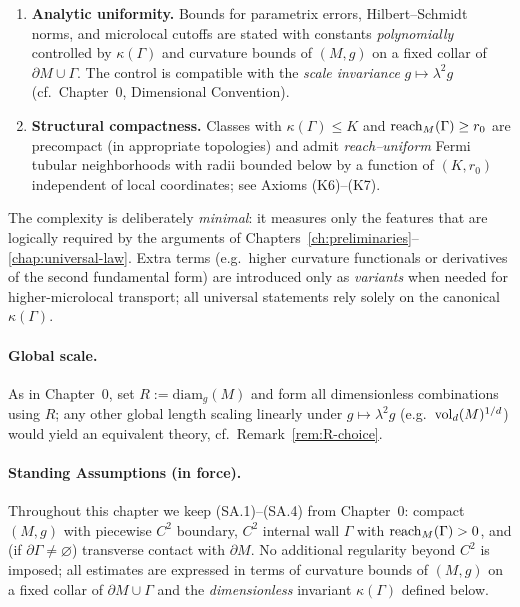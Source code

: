 \begin{enumerate}
  \item \textbf{Analytic uniformity.} Bounds for parametrix errors, Hilbert--Schmidt norms, and microlocal cutoffs are stated with constants \emph{polynomially} controlled by $\kappa(\Gamma)$ and curvature bounds of $(M,g)$ on a fixed collar of $\partial M\cup\Gamma$. The control is compatible with the \emph{scale invariance} $g\mapsto \lambda^2 g$ (cf.\ Chapter~0, Dimensional Convention).
  \item \textbf{Structural compactness.} Classes with $\kappa(\Gamma)\le K$ and $\operatorname{reach}_M(\Gamma)\ge r_0$ are precompact (in appropriate topologies) and admit \emph{reach--uniform} Fermi tubular neighborhoods with radii bounded below by a function of $(K,r_0)$ independent of local coordinates; see Axioms (K6)–(K7).
\end{enumerate}

The complexity is deliberately \emph{minimal}: it measures only the features that are logically required by the arguments of Chapters~\ref{ch:preliminaries}–\ref{chap:universal-law}. Extra terms (e.g.\ higher curvature functionals or derivatives of the second fundamental form) are introduced only as \emph{variants} when needed for higher-microlocal transport; all universal statements rely solely on the canonical $\kappa(\Gamma)$.

\paragraph{Global scale.}
As in Chapter~0, set $R:=\mathrm{diam}_g(M)$ and form all dimensionless combinations using $R$; any other global length scaling linearly under $g\mapsto \lambda^2 g$ (e.g.\ $\operatorname{vol}_d(M)^{1/d}$) would yield an equivalent theory, cf.\ Remark~\ref{rem:R-choice}.

\paragraph{Standing Assumptions (in force).}
Throughout this chapter we keep (SA.1)–(SA.4) from Chapter~0:
compact $(M,g)$ with piecewise $C^2$ boundary, $C^2$ internal wall $\Gamma$ with $\operatorname{reach}_M(\Gamma)>0$, and (if $\partial\Gamma\neq\varnothing$) transverse contact with $\partial M$.
No additional regularity beyond $C^2$ is imposed; all estimates are expressed in terms of curvature bounds of $(M,g)$ on a fixed collar of $\partial M\cup\Gamma$ and the \emph{dimensionless} invariant $\kappa(\Gamma)$ defined below.

